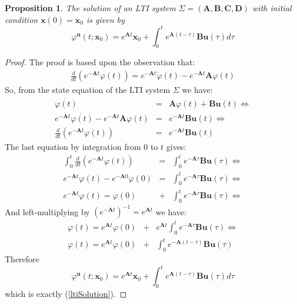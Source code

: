 \documentclass[a4paper,10pt,oneside]{book}
\newtheorem{proposition}[theorem]{Proposition}
\begin{document}
%
%
%
\begin{proposition}\label{proposition:LTI-solution}
 The solution of an LTI system $\Sigma=(\mathbf{A},\mathbf{B},\mathbf{C},\mathbf{D})$ with initial condition $\mathbf{x}(0)=\mathbf{x}_0$ is given by
\begin{equation}
 \varphi^{\mathbf{u}}(t;\mathbf{x}_0)=e^{\mathbf{A}t}\mathbf{x}_0+\int_0^t e^{\mathbf{A}(t-\tau)}\mathbf{Bu}(\tau)d\tau\label{ltiSolution}
\end{equation}
\end{proposition}
\begin{proof}
 The proof is based upon the observation that:
\begin{eqnarray}
 \frac{d}{dt}(e^{-\mathbf{A}t}\varphi(t))=e^{-\mathbf{A}t}\dot{\varphi}(t)-e^{-\mathbf{A}t}\mathbf{A}\varphi(t)
\end{eqnarray}
So, from the state equation of the LTI system $\Sigma$ we have:
\begin{eqnarray}
 \dot{\varphi(t)}&=&\mathbf{A}\varphi(t)+\mathbf{Bu}(t)\Leftrightarrow\\
e^{-\mathbf{A}t}\dot{\varphi(t)}-e^{-\mathbf{A}t}\mathbf{A}\varphi(t)&=&e^{-\mathbf{A}t}\mathbf{Bu}(t)\Leftrightarrow\\
\frac{d}{dt}(e^{-\mathbf{A}t}\varphi(t))&=&e^{-\mathbf{A}t}\mathbf{Bu}(t)
\end{eqnarray}
The last equation by integration from $0$ to $t$ gives:
\begin{eqnarray}
 \int_0^t {\frac{d}{dt}(e^{-\mathbf{A}t}\varphi(t))}&=& \int_0^t e^{-\mathbf{A}\tau}\mathbf{Bu}(\tau)\Leftrightarrow\\
e^{-\mathbf{A}t}\varphi(t)-e^{-\mathbf{A}0}\varphi(0)&=& \int_0^t e^{-\mathbf{A}\tau}\mathbf{Bu}(\tau)\Leftrightarrow\\
e^{-\mathbf{A}t}\varphi(t)=\varphi(0)&+& \int_0^t e^{-\mathbf{A}\tau}\mathbf{Bu}(\tau)\Leftrightarrow
\end{eqnarray}
And left-multiplying by $(e^{-\mathbf{A}t})^{-1}=e^{\mathbf{A}t}$ we have:
\begin{eqnarray}
\varphi(t)=e^{\mathbf{A}t}\varphi(0)&+& e^{\mathbf{A}t}\int_0^t e^{-\mathbf{A}\tau}\mathbf{Bu}(\tau)\Leftrightarrow\\
\varphi(t)=e^{\mathbf{A}t}\varphi(0)&+& \int_0^t e^{-\mathbf{A}(t-\tau)}\mathbf{Bu}(\tau)
\end{eqnarray}
Therefore
\begin{equation}
 \varphi^{\mathbf{u}}(t;\mathbf{x}_0)=e^{\mathbf{A}t}\mathbf{x}_0+\int_0^t e^{\mathbf{A}(t-\tau)}\mathbf{Bu}(\tau)d\tau
\end{equation}
which is exactly (\ref{ltiSolution}).
\end{proof}
\end{document}

